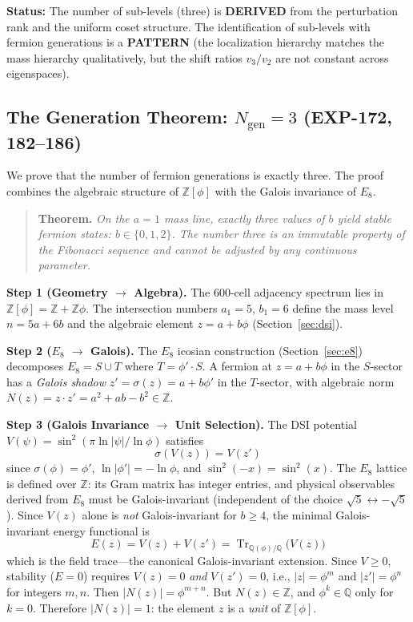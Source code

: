 \documentclass[12pt,a4paper]{article}
\begin{document}
\textbf{Status:} The number of sub-levels (three) is \textbf{DERIVED} from the perturbation rank and the uniform coset structure. The identification of sub-levels with fermion generations is a \textbf{PATTERN} (the localization hierarchy matches the mass hierarchy qualitatively, but the shift ratios $v_3/v_2$ are not constant across eigenspaces).


\subsection{The Generation Theorem: $N_{\text{gen}} = 3$ (EXP-172, 182--186)}
\label{sec:fibonacci_generations}

We prove that the number of fermion generations is exactly three. The proof combines the algebraic structure of $\mathbb{Z}[\phi]$ with the Galois invariance of $E_8$.

\begin{quote}
\textbf{Theorem.} \textit{On the $a=1$ mass line, exactly three values of $b$ yield stable fermion states: $b \in \{0, 1, 2\}$. The number three is an immutable property of the Fibonacci sequence and cannot be adjusted by any continuous parameter.}
\end{quote}

\textbf{Step 1 (Geometry $\to$ Algebra).} The 600-cell adjacency spectrum lies in $\mathbb{Z}[\phi] = \mathbb{Z} + \mathbb{Z}\phi$. The intersection numbers $a_1 = 5$, $b_1 = 6$ define the mass level $n = 5a + 6b$ and the algebraic element $z = a + b\phi$ (Section~\ref{sec:dsi}).

\textbf{Step 2 ($E_8$ $\to$ Galois).} The $E_8$ icosian construction (Section~\ref{sec:e8}) decomposes $E_8 = S \cup T$ where $T = \phi' \cdot S$. A fermion at $z = a + b\phi$ in the $S$-sector has a \emph{Galois shadow} $z' = \sigma(z) = a + b\phi'$ in the $T$-sector, with algebraic norm $N(z) = z \cdot z' = a^2 + ab - b^2 \in \mathbb{Z}$.

\textbf{Step 3 (Galois Invariance $\to$ Unit Selection).} The DSI potential $V(\psi) = \sin^2(\pi \ln|\psi| / \ln\phi)$ satisfies
\begin{equation}
\sigma(V(z)) = V(z')
\label{eq:galois_covariance}
\end{equation}
since $\sigma(\phi) = \phi'$, $\ln|\phi'| = -\ln\phi$, and $\sin^2(-x) = \sin^2(x)$. The $E_8$ lattice is defined over $\mathbb{Z}$: its Gram matrix has integer entries, and physical observables derived from $E_8$ must be Galois-invariant (independent of the choice $\sqrt{5} \leftrightarrow -\sqrt{5}$). Since $V(z)$ alone is \emph{not} Galois-invariant for $b \geq 4$, the minimal Galois-invariant energy functional is
\begin{equation}
E(z) = V(z) + V(z') = \operatorname{Tr}_{\mathbb{Q}(\phi)/\mathbb{Q}}\bigl(V(z)\bigr)
\label{eq:galois_energy}
\end{equation}
which is the field trace---the canonical Galois-invariant extension. Since $V \geq 0$, stability ($E = 0$) requires $V(z) = 0$ \emph{and} $V(z') = 0$, i.e., $|z| = \phi^m$ and $|z'| = \phi^n$ for integers $m, n$. Then $|N(z)| = \phi^{m+n}$. But $N(z) \in \mathbb{Z}$, and $\phi^k \in \mathbb{Q}$ only for $k = 0$. Therefore $|N(z)| = 1$: the element $z$ is a \emph{unit} of $\mathbb{Z}[\phi]$.
\end{document}
